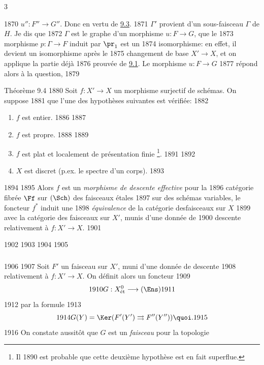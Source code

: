 3	\documentclass[10pt]{../fichiers-configuration-latex/smfart}
\begin{document}
  1870	$u'':F''\rightarrow G''$. Donc en vertu de \hyperref[VIII.lem9.3]{9.3}.
  1871	$\Gamma'$ provient d'un sous-faisceau $\Gamma$ de $H$. Je dis que
  1872	$\Gamma$ est le graphe d'un morphisme $u:F\rightarrow G$, \ie que le
  1873	morphisme $p:\Gamma\rightarrow F$ induit par $\pr_{1}$ est un
  1874	isomorphisme: en effet, il devient un isomorphisme après le
  1875	changement de base $X'\rightarrow X$, et on applique la partie déjà
  1876	prouvée de \hyperref[VIII.prop9.1]{9.1}. Le morphisme $u:F\rightarrow G$
  1877	répond alors à la question, 	
  1879	\begin{enonce*}{Théorème 9.4}
  1880	Soit $f:X'\rightarrow X$ un morphisme surjectif de schémas. On suppose
  1881	que l'une des hypothèses suivantes est vérifiée:
  1882	\begin{enumerate}
  1883	\renewcommand{\theenumi}{\alph{enumi}}
  1884	\renewcommand{\labelenumi}{\theenumi)}
  1885	\item $f$ est entier.
  1886	
  1887	\item $f$ est propre.
  1888	
  1889	\item $f$ est plat et localement de présentation finie \footnote[1]{Il
  1890	est probable que cette deuxième hypothèse est en fait superflue.}.
  1891	
  1892	\item $X$ est discret (p.ex. le spectre d'un corps).
  1893	\end{enumerate}
  1894	
  1895	Alors $f$ est un \emph{morphisme de descente effective} pour la
  1896	catégorie fibrée $\Ff$ sur $(\Sch)$ des faisceaux étales
  1897	sur des schémas variables, \ie le foncteur $f^{\ast}$ induit une
  1898	\emph{équivalence} de la catégorie des\pageoriginale  faisceaux sur $X$
  1899	avec la catégorie des faisceaux sur $X'$, munis d'une donnée de
  1900	descente relativement à $f:X'\rightarrow X$.
  1901	\end{enonce*}
  1902	
  1903	\setcounter{subsection}{4}
  1904	\setcounter{subsubsection}{0}
  1905	\subsubsection{}
  1906	
  1907	Soit $F'$ un faisceau sur $X'$, muni d'une donnée de descente
  1908	relativement à $f:X'\rightarrow X$. On définit alors un foncteur
  1909	$$
  1910	G:X^{0}_{\text{\rm ét}}\longrightarrow (\Ens)
  1911	$$
  1912	par la formule
  1913	$$
  1914	G(Y)=\Ker (F'(Y')\rightrightarrows F''(Y'')){\quoi}.
  1915	$$
  1916	On constate aussitôt que $G$ est un \emph{faisceau} pour la topologie
\end{document}
